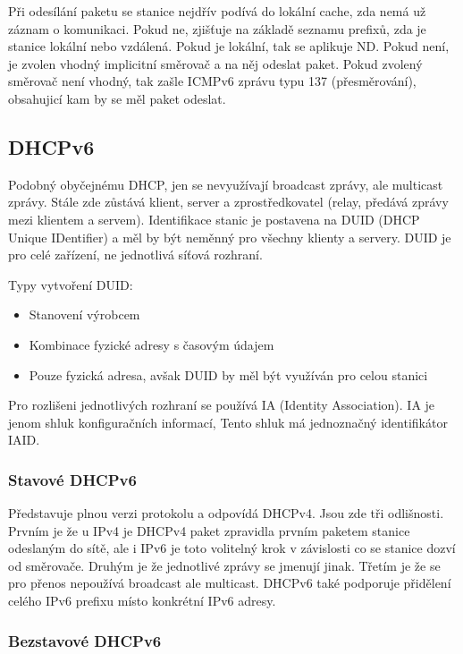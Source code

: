 Při odesílání paketu se stanice nejdřív podívá do lokální cache, zda nemá už záznam o komunikaci.
Pokud ne, zjišťuje na základě seznamu prefixů, zda je stanice lokální nebo vzdálená.
Pokud je lokální, tak se aplikuje ND.
Pokud není, je zvolen vhodný implicitní směrovač a na něj odeslat paket.
Pokud zvolený směrovač není vhodný, tak zašle ICMPv6 zprávu typu 137 (přesměrování), obsahujicí kam by se měl paket odeslat.

\subsection{DHCPv6}

Podobný obyčejnému DHCP, jen se nevyužívají broadcast zprávy, ale multicast zprávy.
Stále zde zůstává klient, server a zprostředkovatel (relay, předává zprávy mezi klientem a servem).
Identifikace stanic je postavena na DUID (DHCP Unique IDentifier) a měl by být neměnný pro všechny klienty a servery.
DUID je pro celé zařízení, ne jednotlivá síťová rozhraní.

Typy vytvoření DUID:

\begin{itemize}[noitemsep]
    \item Stanovení výrobcem
    \item Kombinace fyzické adresy s časovým údajem
    \item Pouze fyzická adresa, avšak DUID by měl být využíván pro celou stanici
\end{itemize}

Pro rozlišeni jednotlivých rozhraní se používá IA (Identity Association). IA je jenom shluk konfiguračních informací, Tento shluk má jednoznačný identifikátor IAID.

\subsubsection{Stavové DHCPv6}

Představuje plnou verzi protokolu a odpovídá DHCPv4.
Jsou zde tři odlišnosti.
Prvním je že u IPv4 je DHCPv4 paket zpravidla prvním paketem stanice odeslaným do sítě, ale i IPv6 je toto volitelný krok v závislosti co se stanice dozví od směrovače.
Druhým je že jednotlivé zprávy se jmenují jinak.
Třetím je že se pro přenos nepoužívá broadcast ale multicast.
DHCPv6 také podporuje přidělení celého IPv6 prefixu místo konkrétní IPv6 adresy.

\subsubsection{Bezstavové DHCPv6}

